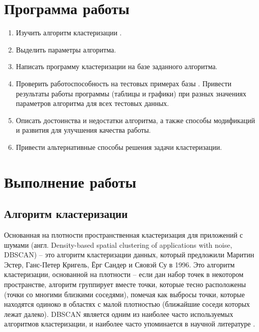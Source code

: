 





\tableofcontents
\newpage

\section{Программа работы}

\begin{enumerate}
	\item Изучить алгоритм кластеризации .
	\item Выделить параметры алгоритма.
	\item Написать программу кластеризации на базе заданного алгоритма.
	\item Проверить работоспособность на тестовых примерах базы \cite{data}. Привести результаты работы программы (таблицы и графики) при разных значениях параметров алгоритма для всех тестовых данных.
	\item Описать достоинства и недостатки алгоритма, а также способы модификаций и развития для улучшения качества работы.
	\item Привести альтернативные способы решения задачи кластеризации.
\end{enumerate}

\section{Выполнение работы}

\subsection{Алгоритм кластеризации }

Основанная на плотности пространственная кластеризация для приложений с шумами (англ. Density-based spatial clustering of applications with noise, DBSCAN) -- это алгоритм кластеризации данных, который предложили Маритин Эстер, Ганс-Петер Кригель, Ёрг Сандер и Сяовэй Су в 1996. Это алгоритм кластеризации, основанной на плотности -- если дан набор точек в некотором пространстве, алгоритм группирует вместе точки, которые тесно расположены (точки со многими близкими соседями), помечая как выбросы точки, которые находятся одиноко в областях с малой плотностью (ближайшие соседи которых лежат далеко). DBSCAN является одним из наиболее часто используемых алгоритмов кластеризации, и наиболее часто упоминается в научной литературе \cite{wiki}.

